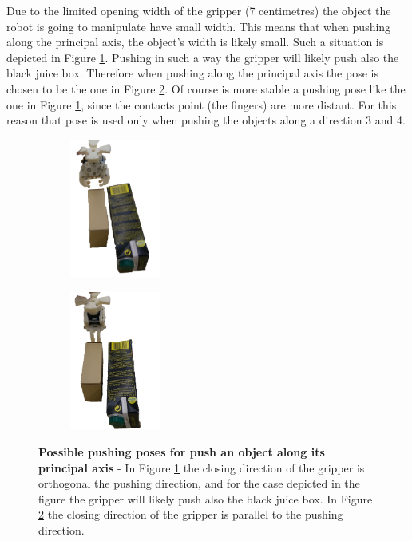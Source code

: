Due to the limited opening width of the gripper (7 centimetres) the object the robot is going to manipulate have small width. This means that when pushing along the principal axis, the object's width is likely small. Such a situation is depicted in Figure \ref{fig:pushing_way1}. Pushing in such a way the gripper will likely push also the black juice box. Therefore when pushing along the principal axis the pose is chosen to be the one in Figure \ref{fig:pushing_way2}. Of course is more stable a pushing pose like the one in Figure \ref{fig:pushing_way1}, since the contacts point (the fingers) are more distant. For this reason that pose is used only when pushing the objects along a direction 3 and 4.

\begin{figure}[tb]
\centering
\begin{subfigure}[t]{0.45\textwidth}
\centering
\includegraphics[width=3cm]{Img/pushing/pushing333.png}
\caption{}\label{fig:pushing_way1}
\end{subfigure}
\begin{subfigure}[t]{0.45\textwidth}
\centering
\includegraphics[width=3cm]{Img/pushing/pushing222.png}
\caption{}\label{fig:pushing_way2}
\end{subfigure}
\caption{\textbf{Possible pushing poses for push an object along its principal axis} - In Figure \ref{fig:pushing_way1} the closing direction of the gripper is orthogonal the pushing direction, and for the case depicted in the figure the gripper will likely push also the black juice box. In Figure \ref{fig:pushing_way2} the closing direction of the gripper is parallel to the pushing direction.}\label{fig:pushing_way}
\end{figure}

